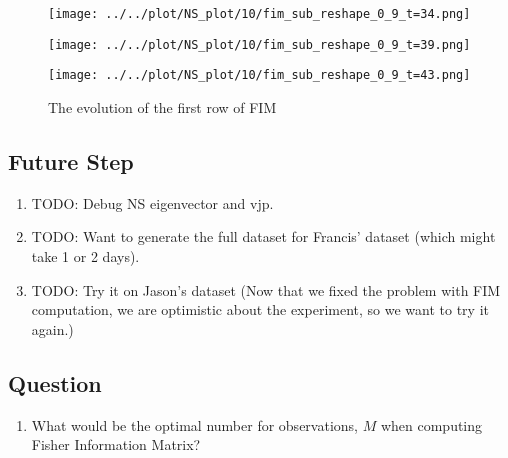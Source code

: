 \documentclass[
]{article}
\providecommand{\tightlist}{%
  \setlength{\itemsep}{0pt}\setlength{\parskip}{0pt}}\usepackage{longtable,booktabs,array}
\begin{document}
\begin{figure}
\begin{minipage}{0.20\linewidth}
\texttt{[image: ../../plot/NS\_plot/10/fim\_sub\_reshape\_0\_9\_t=34.png]}

\end{minipage}%
%
\begin{minipage}{0.20\linewidth}

\texttt{[image: ../../plot/NS\_plot/10/fim\_sub\_reshape\_0\_9\_t=39.png]}

\end{minipage}%
%
\begin{minipage}{0.20\linewidth}

\texttt{[image: ../../plot/NS\_plot/10/fim\_sub\_reshape\_0\_9\_t=43.png]}

\end{minipage}%

\caption{\label{fig-fim_NS}The evolution of the first row of FIM}

\end{figure}%

\subsection{Future Step}\label{future-step}

\begin{enumerate}
\def\labelenumi{\arabic{enumi}.}
\tightlist
\item
  TODO: Debug NS eigenvector and vjp.
\item
  TODO: Want to generate the full dataset for Francis' dataset (which
  might take 1 or 2 days).
\item
  TODO: Try it on Jason's dataset (Now that we fixed the problem with
  FIM computation, we are optimistic about the experiment, so we want to
  try it again.)
\end{enumerate}

\subsection{Question}\label{question}

\begin{enumerate}
\def\labelenumi{\arabic{enumi}.}
\tightlist
\item
  What would be the optimal number for observations, \(M\) when
  computing Fisher Information Matrix?
\end{enumerate}
\end{document}
